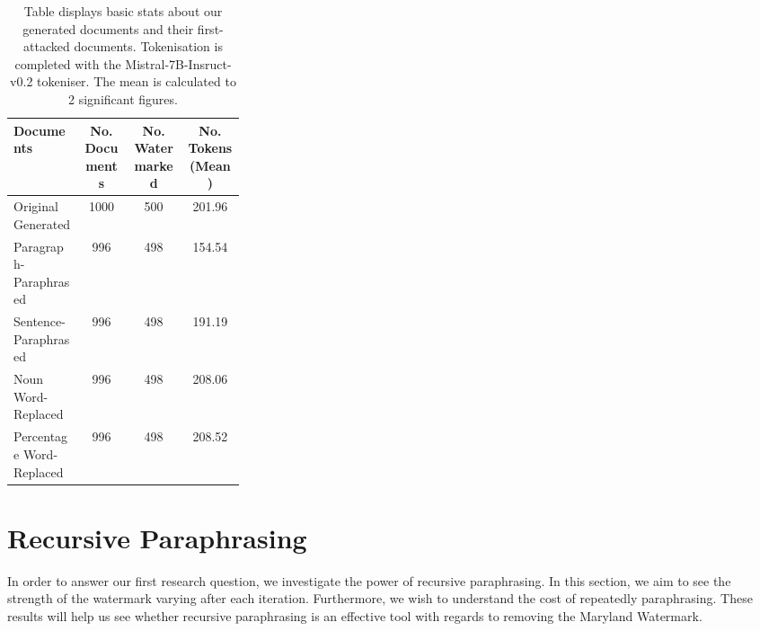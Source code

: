 \documentclass{l4proj}
\theoremstyle{definition}
\newcommand{\codefont}[1]{{\fontfamily{lmtt}\selectfont #1}}
\begin{document}
\begin{table}[ht]
    \centering 
    \begin{tabular}{p{0.30\linewidth}|ccc}
        Documents              & No. Documents & No. Watermarked & No. Tokens (Mean) \\ \hline
        Original Generated    & 1000          & 500             & 201.96                \\
        Paragraph-Paraphrased & 996           & 498             & 154.54                \\
        Sentence-Paraphrased  & 996           & 498             & 191.19               \\
        Noun Word-Replaced         & 996           & 498             & 208.06            \\
        Percentage Word-Replaced & 996              & 498           & 208.52              \\
    \end{tabular}
    \caption{Table displays basic stats about our generated documents and their first-attacked documents. Tokenisation is completed with the \codefont{Mistral-7B-Insruct-v0.2} tokeniser. The mean is calculated to 2 significant figures.}
    \label{table:result-stats}
\end{table}

\section{Recursive Paraphrasing}
    In order to answer our first research question, we investigate the power of recursive paraphrasing. In this section, we aim to see the strength of the watermark varying after each iteration. Furthermore, we wish to understand the cost of repeatedly paraphrasing. These results will help us see whether recursive paraphrasing is an effective tool with regards to removing the Maryland Watermark. 
\end{document}
